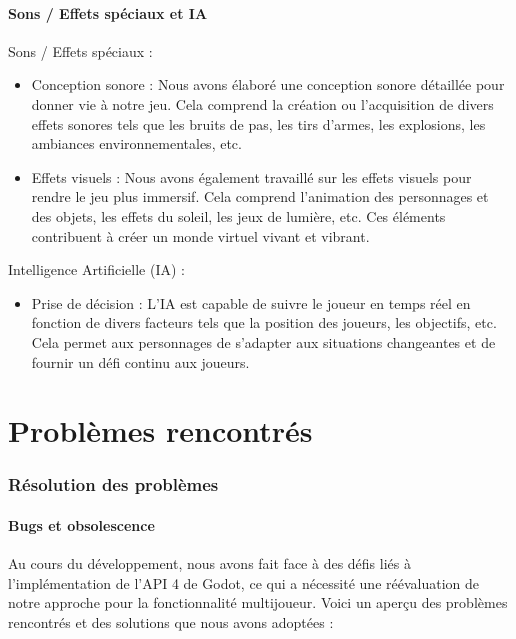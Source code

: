\documentclass[
	article,			%
	11pt,				%
	oneside,			%
	a4paper,			%
	chapter=TITLE,
	french,			%
	sumario=tradicional
	]{base_nt}
\begin{document}
\subsection{Sons / Effets spéciaux et IA}

Sons / Effets spéciaux :

\begin{itemize}
    \item Conception sonore : Nous avons élaboré une conception sonore détaillée pour donner vie à notre jeu. Cela comprend la création ou l'acquisition de divers effets sonores tels que les bruits de pas, les tirs d'armes, les explosions, les ambiances environnementales, etc.
    \item Effets visuels : Nous avons également travaillé sur les effets visuels pour rendre le jeu plus immersif. Cela comprend l'animation des personnages et des objets, les effets du soleil, les jeux de lumière, etc. Ces éléments contribuent à créer un monde virtuel vivant et vibrant.
\end{itemize}

Intelligence Artificielle (IA) :

\begin{itemize}
    \item Prise de décision : L'IA est capable de suivre le joueur en temps réel en fonction de divers facteurs tels que la position des joueurs, les objectifs, etc. Cela permet aux personnages de s'adapter aux situations changeantes et de fournir un défi continu aux joueurs.
\end{itemize}

\vspace{2.3cm}

\part{Problèmes rencontrés}
\section{Résolution des problèmes}

\subsection{Bugs et obsolescence}

Au cours du développement, nous avons fait face à des défis liés à l'implémentation de l'API 4 de Godot, ce qui a nécessité une réévaluation de notre approche pour la fonctionnalité multijoueur. Voici un aperçu des problèmes rencontrés et des solutions que nous avons adoptées :
\end{document}
